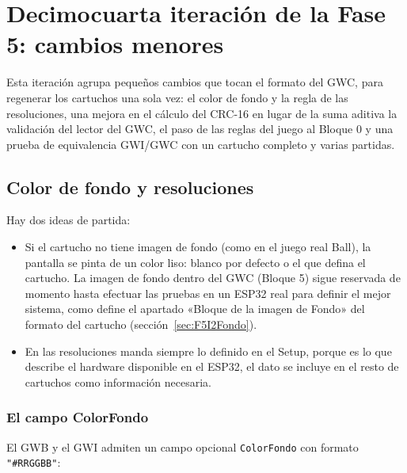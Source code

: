 \section{Decimocuarta iteración de la Fase 5: cambios menores}
\label{sec:F5I14}

Esta iteración agrupa pequeños cambios que tocan el formato del GWC, para regenerar los cartuchos una sola vez: el color de fondo y la regla de las resoluciones, una mejora en el cálculo del CRC-16 en lugar de la suma aditiva la validación del lector del GWC, el paso de las reglas del juego al Bloque 0 y una prueba de equivalencia GWI/GWC con un cartucho completo y varias partidas. 

\subsection{Color de fondo y resoluciones}
\label{sec:F5I14Fondo}

Hay dos ideas de partida:

\begin{itemize}
	\item Si el cartucho no tiene imagen de fondo (como en el juego real Ball), la pantalla se pinta de un color liso: blanco por defecto o el que defina el cartucho. La imagen de fondo dentro del GWC (Bloque 5) sigue reservada de momento hasta efectuar las pruebas en un ESP32 real para definir el mejor sistema, como define el apartado «Bloque de la imagen de Fondo» del formato del cartucho (sección~\ref{sec:F5I2Fondo}).

	\item En las resoluciones manda siempre lo definido en el Setup, porque es lo que describe el hardware disponible en el ESP32, el dato se incluye en el resto de cartuchos como información necesaria.
\end{itemize}

\subsubsection{El campo ColorFondo}

El GWB y el GWI admiten un campo opcional \texttt{ColorFondo} con formato \texttt{"\#RRGGBB"}:

